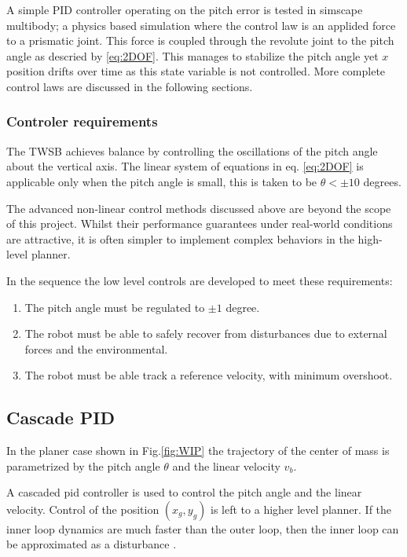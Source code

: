         A simple PID controller operating on the pitch error is tested in simscape multibody; 
        a physics based simulation where the control law is an applided force to a prismatic joint. 
        This force is coupled through the revolute joint to the pitch angle as descried by \ref{eq:2DOF}.
        This manages to stabilize the pitch angle yet $x$ position drifts over time as this 
        state variable is not controlled.
        More complete control laws are discussed in the following sections.
        \subsubsection{Controler requirements}

        The TWSB achieves balance by controlling the oscillations of the pitch angle about the 
        vertical axis. The linear system of equations in eq. \ref{eq:2DOF} is applicable 
        only when the pitch angle is small, this is taken to be $\theta < ±10$ degrees. 

        The advanced non-linear control methods discussed above are beyond the scope of this project. 
        Whilst their performance guarantees under real-world conditions are attractive, it is often simpler 
        to implement complex behaviors in the high-level planner.

        In the sequence the low level controls are developed to meet these requirements:
        \begin{enumerate}
            \item The pitch angle must be regulated to $±1$ degree.
            \item The robot must be able to safely recover from disturbances due to external forces and the environmental.
            \item The robot must be able track a reference velocity, with minimum overshoot.
        \end{enumerate}

        \subsection{Cascade PID}
        
        In the planer case shown in Fig.\ref{fig:WIP} the trajectory of the center of mass is parametrized by 
        the pitch angle $\theta$ and the linear velocity $v_b$. 
    
        A cascaded pid controller is used to control the pitch angle and the linear velocity. 
        Control of the position $(x_g,y_g)$ is left to a higher level planner.  
        If the inner loop dynamics are much faster than the outer loop, 
        then the inner loop can be approximated as a disturbance \cite{Robust2DofPID}.

